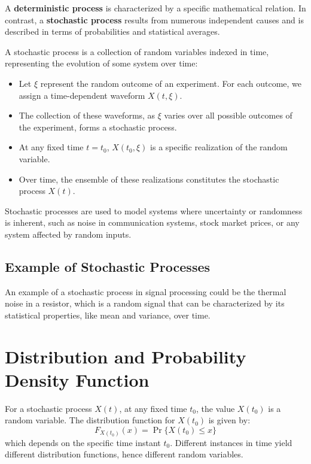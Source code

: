 A \textbf{deterministic process} is characterized by a specific mathematical relation. In contrast, a \textbf{stochastic process} results from numerous independent causes and is described in terms of probabilities and statistical averages.

A stochastic process is a collection of random variables indexed in time, representing the evolution of some system over time:
\begin{itemize}
    \item Let \( \xi \) represent the random outcome of an experiment. For each outcome, we assign a time-dependent waveform \( X(t, \xi) \).
    \item The collection of these waveforms, as \( \xi \) varies over all possible outcomes of the experiment, forms a stochastic process.
    \item At any fixed time \( t = t_0 \), \( X(t_0, \xi) \) is a specific realization of the random variable.
    \item Over time, the ensemble of these realizations constitutes the stochastic process \( X(t) \).
\end{itemize}

Stochastic processes are used to model systems where uncertainty or randomness is inherent, such as noise in communication systems, stock market prices, or any system affected by random inputs.

\subsection*{Example of Stochastic Processes}
An example of a stochastic process in signal processing could be the thermal noise in a resistor, which is a random signal that can be characterized by its statistical properties, like mean and variance, over time.

\section*{Distribution and Probability Density Function}

For a stochastic process \( X(t) \), at any fixed time \( t_0 \), the value \( X(t_0) \) is a random variable. The distribution function for \( X(t_0) \) is given by:
\[ F_{X(t_0)}(x) = \Pr\{X(t_0) \leq x\} \]
which depends on the specific time instant \( t_0 \). Different instances in time yield different distribution functions, hence different random variables.


